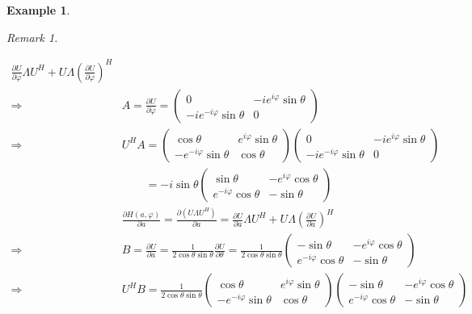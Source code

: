 \documentclass[11pt]{amsart}
\numberwithin{equation}{section}
\theoremstyle{plain}
\newtheorem{eg}[theorem]{Example}
\theoremstyle{plain}
\numberwithin{equation}{section}
\theoremstyle{remark}
\newtheorem{remark}[theorem]{Remark}
\begin{document}
\begin{eg}
\begin{remark}
\begin{list}{}
\begin{equation*}
\begin{aligned}
		\frac{\partial U}{\partial \varphi} \Lambda U^H+
		U\Lambda \left(\frac{\partial U}{\partial \varphi}\right)^H\\
		\Rightarrow & 
		A=\frac{\partial U}{\partial \varphi}=
		\begin{pmatrix}
		0 & -ie^{i\varphi} \sin \theta  \\
		-ie^{-i\varphi} \sin \theta  & 0
		\end{pmatrix}
		\\
		\Rightarrow & 
		U^HA=\begin{pmatrix}
		\cos \theta & e^{i\varphi} \sin \theta  \\
		-e^{-i\varphi} \sin \theta  & \cos \theta
		\end{pmatrix}
		\begin{pmatrix}
		0 & -ie^{i\varphi} \sin \theta  \\
		-ie^{-i\varphi} \sin \theta  & 0
		\end{pmatrix}\\
		&\phantom{U^HA}=
		-i \sin \theta 
		\begin{pmatrix}
		\sin \theta & -e^{i\varphi} \cos \theta  \\
		e^{-i\varphi} \cos \theta  & -\sin \theta
		\end{pmatrix}\\
		&\frac{\partial H(a,\varphi)}{\partial a}=
		\frac{\partial (U\Lambda U^H)}{\partial a}=
		\frac{\partial U}{\partial a} \Lambda U^H+
		U\Lambda \left(\frac{\partial U}{\partial a}\right)^H\\
		\Rightarrow & 
		B=\frac{\partial U}{\partial a}=
		\frac{1}{2 \cos \theta \sin \theta}\frac{\partial U}{\partial \theta}=
		\frac{1}{2 \cos \theta \sin \theta}
		\begin{pmatrix}
		-\sin \theta & -e^{i\varphi} \cos \theta  \\
		e^{-i\varphi} \cos \theta  & -\sin \theta
		\end{pmatrix}\\
		\Rightarrow & 
		U^HB=\frac{1}{2 \cos \theta \sin \theta}
		\begin{pmatrix}
		\cos \theta & e^{i\varphi} \sin \theta  \\
		-e^{-i\varphi} \sin \theta  & \cos \theta
		\end{pmatrix}
		\begin{pmatrix}
		-\sin \theta & -e^{i\varphi} \cos \theta  \\
		e^{-i\varphi} \cos \theta  & -\sin \theta
		\end{pmatrix}\\

\end{aligned}
\end{equation*}
\end{list}
\end{remark}
\end{eg}
\end{document}
